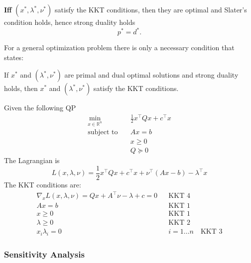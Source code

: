 \newpar{}

\textbf{Iff} $(x^*,\lambda^*,\nu^*)$ satisfy the KKT conditions, then they are optimal and Slater's condition holds, hence strong duality holds\begin{equation*}
    p^*=d^*.
\end{equation*}

\newpar{}

For a general optimization problem there is only a necessary condition that states:

If $x^*$ and $(\lambda^*,\nu^*)$ are primal and dual optimal solutions and strong duality holds, then $x^*$ and $(\lambda^*,\nu^*)$ satisfy the KKT conditions.

\begin{examplesection}
    Given the following QP
    \begin{align*}
        \min_{x\in\mathbb{R}^n} & \frac{1}{2}x^\top Qx + c^\top x \\
        \text{subject to}\quad  & Ax=b                            \\
                                & x\geq 0                         \\
                                & Q \succeq 0
    \end{align*}
    The Lagrangian is
    \begin{equation*}
        L(x,\lambda,\nu) = \frac{1}{2}x^\top Qx +c^\top x +\nu^\top(Ax-b) -\lambda^\top x
    \end{equation*}
    The KKT conditions are:
    \begin{align*}
        \nabla_x L(x,\lambda,\nu) = Qx + A^\top \nu -\lambda +c = 0 &  & \text{KKT 4}                  \\
        Ax=b                                                        &  & \text{KKT 1}                  \\
        x\geq 0                                                     &  & \text{KKT 1}                  \\
        \lambda \geq 0                                              &  & \text{KKT 2}                  \\
        x_i\lambda_i = 0                                            &  & i=1\ldots n \quad\text{KKT 3}
    \end{align*}
\end{examplesection}

\subsubsection{Sensitivity Analysis}

